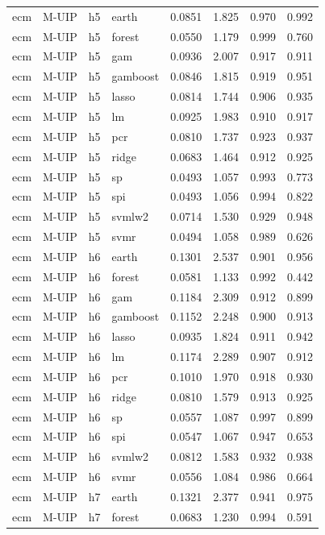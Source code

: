 \begin{ThreePartTable}
\begin{longtable}[t]{llclcccc}
\addlinespace
ecm & M-UIP & h5 & earth & 0.0851 & 1.825 & 0.970 & 0.992\\
ecm & M-UIP & h5 & forest & 0.0550 & 1.179 & 0.999 & 0.760\\
ecm & M-UIP & h5 & gam & 0.0936 & 2.007 & 0.917 & 0.911\\
ecm & M-UIP & h5 & gamboost & 0.0846 & 1.815 & 0.919 & 0.951\\
ecm & M-UIP & h5 & lasso & 0.0814 & 1.744 & 0.906 & 0.935\\
ecm & M-UIP & h5 & lm & 0.0925 & 1.983 & 0.910 & 0.917\\
ecm & M-UIP & h5 & pcr & 0.0810 & 1.737 & 0.923 & 0.937\\
ecm & M-UIP & h5 & ridge & 0.0683 & 1.464 & 0.912 & 0.925\\
ecm & M-UIP & h5 & sp & 0.0493 & 1.057 & 0.993 & 0.773\\
ecm & M-UIP & h5 & spi & 0.0493 & 1.056 & 0.994 & 0.822\\
ecm & M-UIP & h5 & svmlw2 & 0.0714 & 1.530 & 0.929 & 0.948\\
ecm & M-UIP & h5 & svmr & 0.0494 & 1.058 & 0.989 & 0.626\\
\addlinespace
ecm & M-UIP & h6 & earth & 0.1301 & 2.537 & 0.901 & 0.956\\
ecm & M-UIP & h6 & forest & 0.0581 & 1.133 & 0.992 & 0.442\\
ecm & M-UIP & h6 & gam & 0.1184 & 2.309 & 0.912 & 0.899\\
ecm & M-UIP & h6 & gamboost & 0.1152 & 2.248 & 0.900 & 0.913\\
ecm & M-UIP & h6 & lasso & 0.0935 & 1.824 & 0.911 & 0.942\\
ecm & M-UIP & h6 & lm & 0.1174 & 2.289 & 0.907 & 0.912\\
ecm & M-UIP & h6 & pcr & 0.1010 & 1.970 & 0.918 & 0.930\\
ecm & M-UIP & h6 & ridge & 0.0810 & 1.579 & 0.913 & 0.925\\
ecm & M-UIP & h6 & sp & 0.0557 & 1.087 & 0.997 & 0.899\\
ecm & M-UIP & h6 & spi & 0.0547 & 1.067 & 0.947 & 0.653\\
ecm & M-UIP & h6 & svmlw2 & 0.0812 & 1.583 & 0.932 & 0.938\\
ecm & M-UIP & h6 & svmr & 0.0556 & 1.084 & 0.986 & 0.664\\
\addlinespace
ecm & M-UIP & h7 & earth & 0.1321 & 2.377 & 0.941 & 0.975\\
ecm & M-UIP & h7 & forest & 0.0683 & 1.230 & 0.994 & 0.591\\

\end{longtable}
\end{ThreePartTable}
